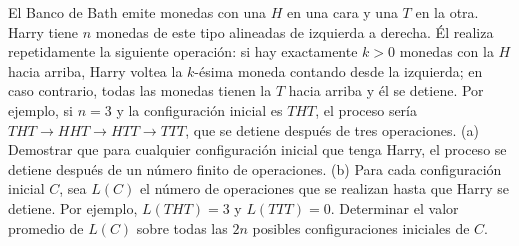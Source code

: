 El Banco de Bath emite monedas con una $H$ en una cara y una $T$ en la otra. Harry tiene $n$ monedas de este tipo alineadas de izquierda a derecha. Él realiza repetidamente la siguiente operación: si hay exactamente $k \gt 0$ monedas con la $H$ hacia arriba, Harry voltea la $k$-ésima moneda contando desde la izquierda; en caso contrario, todas las monedas tienen la $T$ hacia arriba y él se detiene. Por ejemplo, si $n = 3$ y la configuración inicial es $THT$, el proceso sería $THT \to HHT \to HTT \to TTT$, que se detiene después de tres operaciones.
(a) Demostrar que para cualquier configuración inicial que tenga Harry, el proceso se detiene después de un número finito de operaciones.
(b) Para cada configuración inicial $C$, sea $L(C)$ el número de operaciones que se realizan hasta que Harry se detiene. Por ejemplo, $L(THT) = 3$ y $L(TTT) = 0$. Determinar el valor promedio de $L(C)$ sobre todas las $2n$ posibles configuraciones iniciales de $C$.